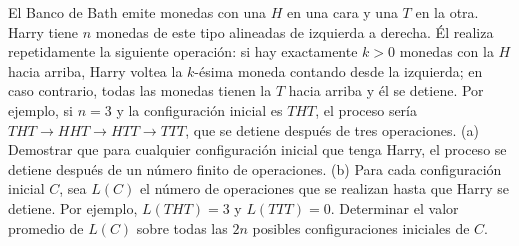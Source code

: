 El Banco de Bath emite monedas con una $H$ en una cara y una $T$ en la otra. Harry tiene $n$ monedas de este tipo alineadas de izquierda a derecha. Él realiza repetidamente la siguiente operación: si hay exactamente $k \gt 0$ monedas con la $H$ hacia arriba, Harry voltea la $k$-ésima moneda contando desde la izquierda; en caso contrario, todas las monedas tienen la $T$ hacia arriba y él se detiene. Por ejemplo, si $n = 3$ y la configuración inicial es $THT$, el proceso sería $THT \to HHT \to HTT \to TTT$, que se detiene después de tres operaciones.
(a) Demostrar que para cualquier configuración inicial que tenga Harry, el proceso se detiene después de un número finito de operaciones.
(b) Para cada configuración inicial $C$, sea $L(C)$ el número de operaciones que se realizan hasta que Harry se detiene. Por ejemplo, $L(THT) = 3$ y $L(TTT) = 0$. Determinar el valor promedio de $L(C)$ sobre todas las $2n$ posibles configuraciones iniciales de $C$.